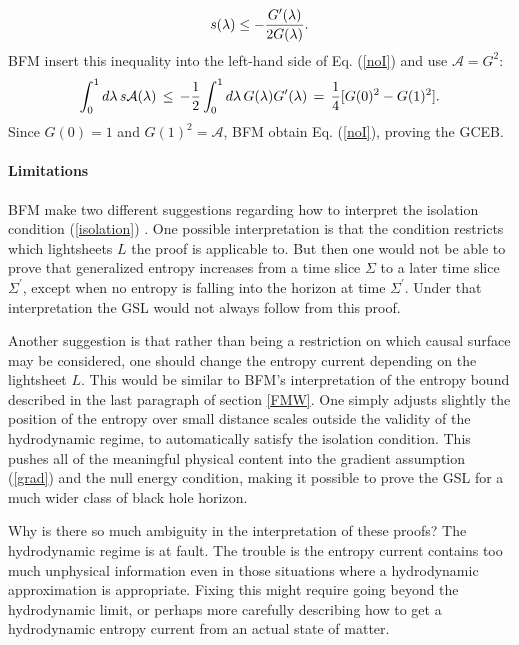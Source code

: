 \documentclass[12pt]{article}
\begin{document}
\begin{equation}
s(\lambda) \le -{{G^{\prime}(\lambda)}\over{2G(\lambda)}}.
\end{equation}
BFM insert this inequality into the left-hand side of Eq. (\ref{noI}) and use $\mathcal{A} = G^2$:
\begin{equation}
\int_0^1 d\lambda\,s\mathcal{A}(\lambda) \,\le\,
-{1 \over 2}\int_0^1 d\lambda\, G(\lambda)G^{\prime}(\lambda) \,=\,
{1 \over 4}[G(0)^2 - G(1)^2].
\end{equation}
Since $G(0) = 1$ and $G(1)^2 = \mathcal{A}$, BFM obtain Eq. (\ref{noI}), proving the GCEB.

\paragraph{Limitations}

BFM make two different suggestions regarding how to interpret the isolation condition (\ref{isolation}) \cite{BFM03}.  One possible interpretation is that the condition restricts which lightsheets $L$ the proof is applicable to.  But then one would not be able to prove that generalized entropy increases from a time slice $\Sigma$ to a later time slice $\Sigma^{\prime}$, except when no entropy is falling into the horizon at time $\Sigma^{\prime}$.  Under that interpretation the GSL would not always follow from this proof.

Another suggestion is that rather than being a restriction on which causal surface may be considered, one should change the entropy current depending on the lightsheet $L$.  This would be similar to BFM's interpretation of the entropy bound described in the last paragraph of section \ref{FMW}.  One simply adjusts slightly the position of the entropy over small distance scales outside the validity of the hydrodynamic regime, to automatically satisfy the isolation condition.  This pushes all of the meaningful physical content into the gradient assumption (\ref{grad}) and the null energy condition, making it possible to prove the GSL for a much wider class of black hole horizon.

Why is there so much ambiguity in the interpretation of these proofs?  The hydrodynamic regime is at fault.  The trouble is the entropy current contains too much unphysical information even in those situations where a hydrodynamic approximation is appropriate.  Fixing this might require going beyond the hydrodynamic limit, or perhaps more carefully describing how to get a hydrodynamic entropy current from an actual state of matter.
\end{document}
